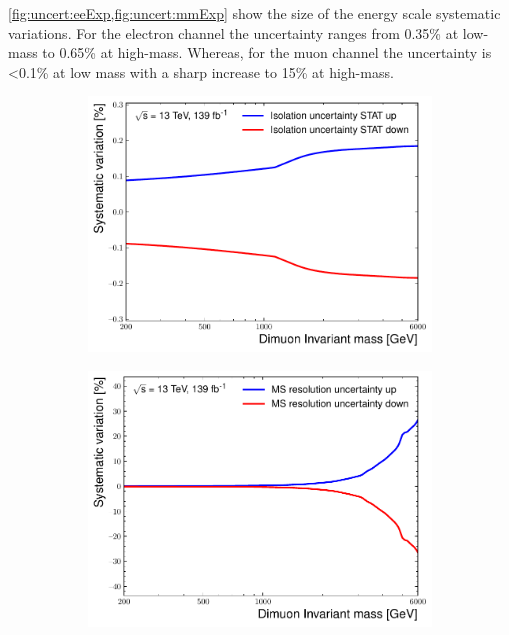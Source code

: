 \cref{fig:uncert:eeExp,fig:uncert:mmExp} show the size of the energy scale systematic variations. For the electron channel the uncertainty ranges from 0.35\% at low-mass to 0.65\% at high-mass. Whereas, for the muon channel the uncertainty is <0.1\% at low mass with a sharp increase to 15\% at high-mass. 

\begin{figure}[]
    \centering
    \begin{subfigure}[b]{0.42\textwidth}
        \centering
        \includegraphics[width=\textwidth]{figures/analysis/datamc/Uncertainties/exp/mm/m_uu_pstOR_MUON_EFF_ISO_STAT__1up.pdf}
        \caption{}
        \label{fig:uncert:mmIso}
    \end{subfigure}
    \begin{subfigure}[b]{0.42\textwidth}
        \centering
        \includegraphics[width=\textwidth]{figures/analysis/datamc/Uncertainties/exp/mm/m_uu_pstOR_MUON_MS__1up.pdf}

\end{subfigure}
\end{figure}
